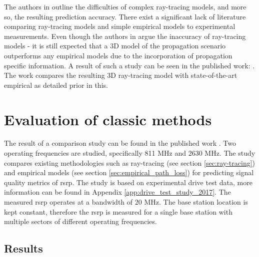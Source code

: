 The authors in \cite{Vitucci2015} outline the difficulties of complex ray-tracing models, and more so, the resulting prediction accuracy. There exist a significant lack of literature comparing ray-tracing models and simple empirical models to experimental measurements. Even though the authors in \cite{Vitucci2015} argue the inaccuracy of ray-tracing models - it is still expected that a 3D model of the propagation scenario outperforms any empirical models due to the incorporation of propagation specific information. A result of such a study can be seen in the published work: \cite{Thrane2019ComparisonGHz}. The work compares the resulting 3D ray-tracing model with state-of-the-art empirical as detailed prior in this.



\section{Evaluation of classic methods}\label{sec:comparison_ghz_paper}
The result of a comparison study can be found in the published work \cite{Thrane2019ComparisonGHz}. Two operating frequencies are studied, specifically 811 MHz and 2630 MHz. The study compares existing methodologies such as ray-tracing (see section \ref{sec:ray-tracing}) and empirical models (see section \ref{sec:empirical_path_loss}) for predicting signal quality metrics of \gls{rsrp}. The study is based on experimental drive test data, more information can be found in Appendix \ref{app:drive_test_study_2017}. The measured \gls{rsrp} operates at a bandwidth of $20$ MHz. The base station location is kept constant, therefore the \gls{rsrp} is measured for a single base station with multiple sectors of different operating frequencies. 


\subsection{Results}

